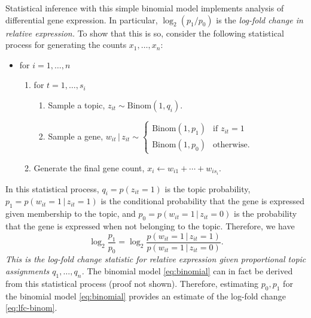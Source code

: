 \documentclass[final]{siamart171218}
\begin{document}
Statistical inference with this simple binomial model implements
analysis of differential gene expression. In particular,
$\log_2(p_1/p_0)$ is the {\em log-fold change in relative expression.}
To show that this is so, consider the following statistical process
for generating the counts $x_1, \ldots, x_n$:
\vspace{1em}
\begin{itemize}

\item for $i = 1, \ldots, n$
\begin{enumerate}

  \item for $t = 1, \ldots, s_i$
  \begin{enumerate}

  \item Sample a topic, $z_{it} \sim \mathrm{Binom}(1,q_i)$.

  \item Sample a gene, $w_{it} \,|\, z_{it} \sim \left\{\begin{array}{ll}
  \mathrm{Binom}(1,p_1) & \mbox{if $z_{it} = 1$} \\
  \mathrm{Binom}(1,p_0) & \mbox{otherwise.}
  \end{array}\right.$

  \end{enumerate}

  \item Generate the final gene count, 
  $x_i \leftarrow w_{i1} + \cdots + w_{is_i}$.

\end{enumerate}
\end{itemize}
\vspace{1em} In this statistical process, $q_i = p(z_{it} = 1)$ is the
topic probability, $p_1 = p(w_{it} = 1 \,|\, z_{it} = 1)$ is the
conditional probability that the gene is expressed given membership to
the topic, and $p_0 = p(w_{it} = 1 \,|\, z_{it} = 0)$ is the
probability that the gene is expressed when not belonging to the
topic. Therefore, we have
\begin{equation}
\log_2 \frac{p_1}{p_0} = 
\log_2 \frac{p(w_{it} = 1 \,|\, z_{it} = 1)}
            {p(w_{it} = 1 \,|\, z_{it} = 0)}.
\label{eq:lfc-binom}
\end{equation}
{\em This is the log-fold change statistic for relative expression
  given proportional topic assignments $q_1, \ldots, q_n$.} The
binomial model \eqref{eq:binomial} can in fact be derived from this
statistical process (proof not shown). Therefore, estimating $p_0,
p_1$ for the binomial model \eqref{eq:binomial} provides an estimate
of the log-fold change \eqref{eq:lfc-binom}.
\end{document}

